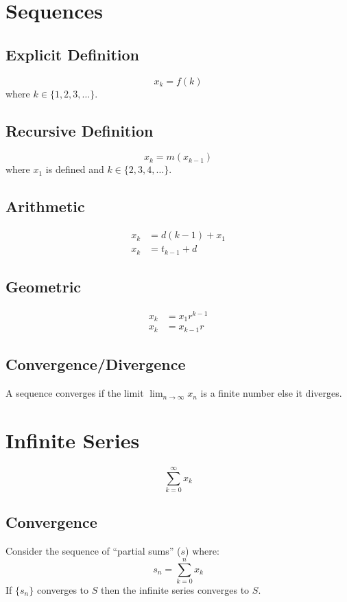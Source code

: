 \documentclass[12pt]{article}
\newcommand*{\isum}[1]{\sum\limits_{#1}^\infty}
\newcommand*{\fixmath}{%
  \makebox{}\vspace{\glueexpr-\baselineskip-\abovedisplayskip}}
\newenvironment{fixaskip}{\setlength{\abovedisplayskip}{0pt}\fixmath%
  \ignorespaces}{\ignorespacesafterend}
\newenvironment{fixskip}{\setlength{\abovedisplayskip}{0pt}%
  \setlength{\belowdisplayskip}{0pt}\fixmath\ignorespaces}%
  {\ignorespacesafterend}
\begin{document}
\section*{Sequences}
\subsection*{Explicit Definition}
\begin{fixaskip}
  \[
    x_k = f(k)
  \]
\end{fixaskip}
where \(k \in \{1,2,3,\dots\}\).
\subsection*{Recursive Definition}
\begin{fixaskip}
  \[
    x_k = m(x_{k-1})
  \]
\end{fixaskip}
where \(x_1\) is defined and \(k \in \{2,3,4,\dots\}\).
\subsection*{Arithmetic}
\begin{fixskip}
  \begin{align*}
    x_k &= d(k-1) + x_1\\
    x_k &= t_{k-1} + d
  \end{align*}
\end{fixskip}
\subsection*{Geometric}
\begin{fixskip}
  \begin{align*}
    x_k &= x_1r^{k-1}\\
    x_k &= x_{k-1} r
  \end{align*}
\end{fixskip}
\subsection*{Convergence\slash Divergence}
A sequence converges if the limit \(\displaystyle\lim_{n \to \infty} x_n\) is
a finite number else it diverges.
\section*{Infinite Series}
\begin{fixskip}
  \[
    \isum{k=0} x_k
  \]
\end{fixskip}
\subsection*{Convergence}
Consider the sequence of ``partial sums'' (\(s\)) where:
\[
  s_n = \sum_{k=0}^n x_k
\]
If \(\{s_n\}\) converges to \(S\) then the infinite series converges to \(S\).
\end{document}
